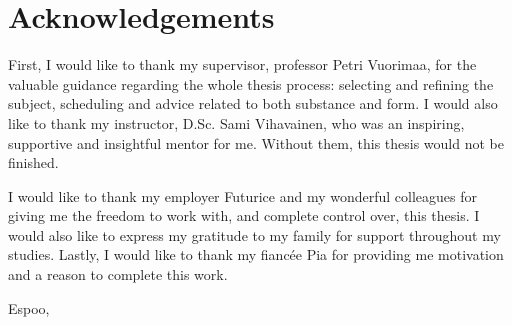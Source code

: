 
\chapter*{Acknowledgements}

First, I would like to thank my supervisor, professor Petri Vuorimaa, for the valuable guidance regarding the whole thesis process: selecting and refining the subject, scheduling and advice related to both substance and form. I would also like to thank my instructor, D.Sc. Sami Vihavainen, who was an inspiring, supportive and insightful mentor for me. Without them, this thesis would not be finished.

I would like to thank my employer Futurice and my wonderful colleagues for giving me the freedom to work with, and complete control over, this thesis. I would also like to express my gratitude to my family for support throughout my studies. Lastly, I would like to thank my fiancée Pia for providing me motivation and a reason to complete this work.

\vskip 10mm

\noindent Espoo, \DATE
\vskip 5mm
\noindent\AUTHOR